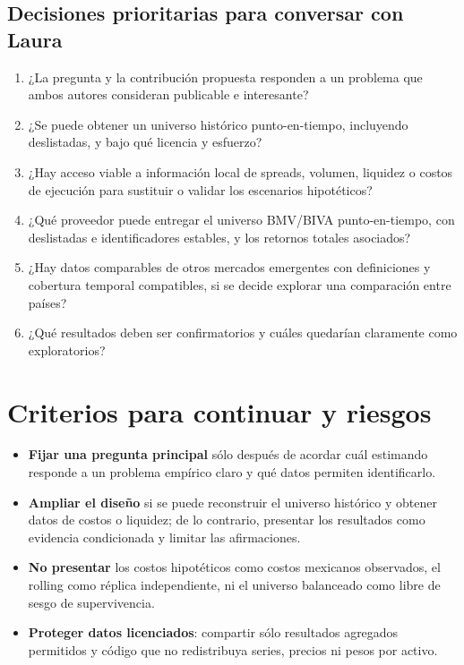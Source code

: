 \documentclass[11pt]{article}
\begin{document}
\subsection{Decisiones prioritarias para conversar con Laura}

\begin{enumerate}
\item ¿La pregunta y la contribución propuesta responden a un problema que
ambos autores consideran publicable e interesante?
\item ¿Se puede obtener un universo histórico punto-en-tiempo, incluyendo
deslistadas, y bajo qué licencia y esfuerzo?
\item ¿Hay acceso viable a información local de spreads, volumen, liquidez o
costos de ejecución para sustituir o validar los escenarios hipotéticos?
\item ¿Qué proveedor puede entregar el universo BMV/BIVA punto-en-tiempo, con
deslistadas e identificadores estables, y los retornos totales asociados?
\item ¿Hay datos comparables de otros mercados emergentes con definiciones y
cobertura temporal compatibles, si se decide explorar una comparación
entre países?
\item ¿Qué resultados deben ser confirmatorios y cuáles quedarían claramente
como exploratorios?
\end{enumerate}

\section{Criterios para continuar y riesgos}

\begin{itemize}
\item \textbf{Fijar una pregunta principal} sólo después de acordar cuál
estimando responde a un problema empírico claro y qué datos permiten
identificarlo.
\item \textbf{Ampliar el diseño} si se puede reconstruir el universo histórico
y obtener datos de costos o liquidez; de lo contrario, presentar los
resultados como evidencia condicionada y limitar las afirmaciones.
\item \textbf{No presentar} los costos hipotéticos como costos mexicanos
observados, el rolling como réplica independiente, ni el universo balanceado
como libre de sesgo de supervivencia.
\item \textbf{Proteger datos licenciados}: compartir sólo resultados
agregados permitidos y código que no redistribuya series, precios ni pesos
por activo.
\end{itemize}
\end{document}
